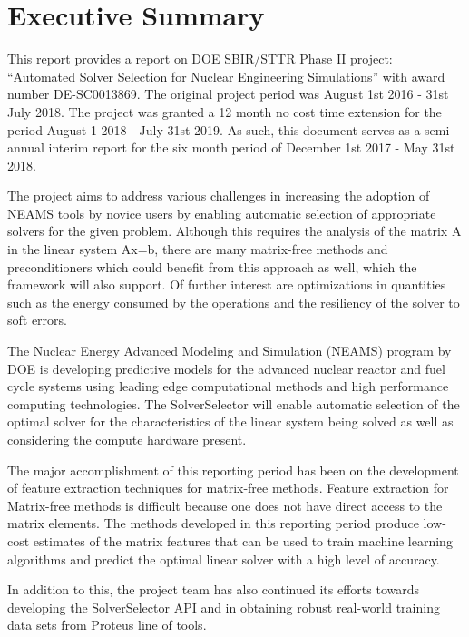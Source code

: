 \section{ Executive Summary } 
This report provides a report on DOE SBIR/STTR Phase II project: 
“Automated Solver Selection for Nuclear Engineering Simulations” with award 
number DE-SC0013869. The original project period was August 1st 2016 - 31st July 2018.
The project was granted a 12 month no cost time extension for the period August 1 2018 - July 31st
2019. As such, this document serves as a semi-annual interim report for the six month period of December 
1st 2017 - May 31st 2018. 

The project aims to address various challenges in increasing the adoption of NEAMS tools by 
novice users by enabling automatic selection of appropriate solvers for the 
given problem. Although this requires the analysis of the matrix A in the linear 
system Ax=b, there are many matrix-free methods and preconditioners which could 
benefit from this approach as well, which the framework will also support. Of 
further interest are optimizations in quantities such as the energy consumed by 
the operations and the resiliency of the solver to soft errors.

The Nuclear Energy Advanced Modeling and Simulation (NEAMS) program by DOE is
developing predictive models for the advanced nuclear reactor and fuel cycle 
systems using leading edge computational methods and high performance computing 
technologies. The SolverSelector will enable automatic selection of the optimal 
solver for the characteristics of the linear system being solved as well as 
considering the compute hardware present. 

The major accomplishment of this reporting period has been on the development of feature
extraction techniques for matrix-free methods. Feature extraction for Matrix-free methods is difficult because one does not have direct access to the matrix elements. The methods developed 
in this reporting period produce low-cost estimates of the matrix features that can be used to 
train machine learning algorithms and predict the optimal linear solver with a high level of accuracy. 

In addition to this, the project team has also continued its efforts towards developing the SolverSelector API
and in obtaining robust real-world training data sets from Proteus line of tools. 

